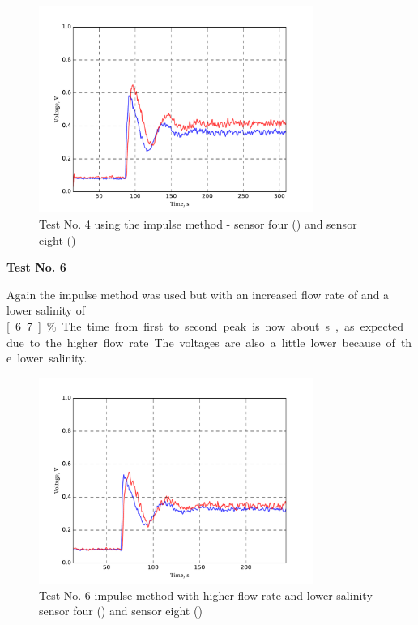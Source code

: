 \begin{figure}[H]
	\begin{center}
		\includegraphics[width=0.8\textwidth]{images/log080716_4.pdf} 
		\caption{Test No. 4 using the impulse method - sensor four (\drawline[blue]) and sensor eight (\drawline[red])}
		\label{fig:test4}
	\end{center}
\end{figure}

\textbf{Test No. 6}

Again the impulse method was used but with an increased flow rate of  and a lower salinity of \unit[6.7]{\%}. The time from first to second peak is now about \unit[40]{s}, as expected due to the higher flow rate. The voltages are also a little lower because of the lower salinity.

\begin{figure}[H]
	\begin{center}
		\includegraphics[width=0.8\textwidth]{images/log080716_6.pdf} 
		\caption{Test No. 6 impulse method with higher flow rate and lower salinity - sensor four (\drawline[blue]) and sensor eight (\drawline[red])}
		\label{fig:test6}
	\end{center}
\end{figure}

